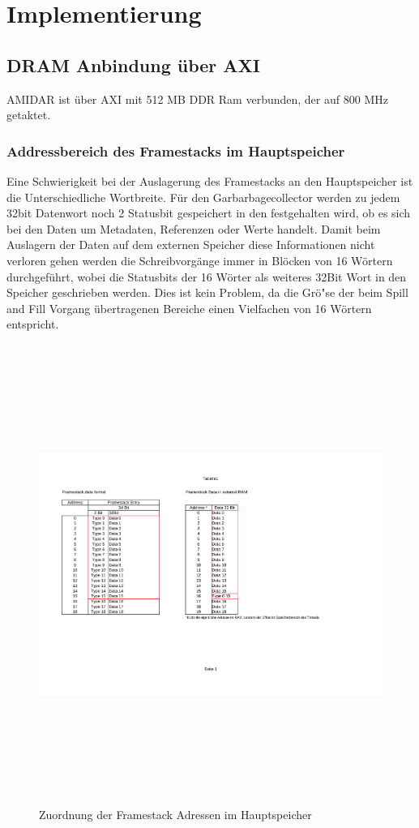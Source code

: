 \chapter{Implementierung}
\label{cha:Implementierung}
\section{DRAM Anbindung \"uber AXI}
AMIDAR ist \"uber AXI mit 512 MB DDR Ram verbunden, der auf 800 MHz getaktet.


\subsection{Addressbereich des Framestacks im Hauptspeicher}
Eine Schwierigkeit bei der Auslagerung des Framestacks an den Hauptspeicher ist die Unterschiedliche Wortbreite. 
F\"ur den Garbarbagecollector werden zu jedem 32bit Datenwort noch 2 Statusbit gespeichert in den festgehalten wird, ob es sich bei den Daten um Metadaten, Referenzen oder Werte handelt. Damit beim Auslagern der Daten auf dem externen Speicher diese Informationen nicht verloren gehen werden die Schreibvorg\"ange immer in Bl\"ocken von 16 W\"ortern durchgef\"uhrt, wobei die Statusbits der 16 W\"orter als weiteres 32Bit Wort in den Speicher geschrieben werden. Dies ist kein Problem, da die Gr\"o"se der beim Spill and Fill Vorgang \"ubertragenen Bereiche einen Vielfachen von 16 W\"ortern entspricht. 

\begin{figure}
	\centering
	\includegraphics[height = 15cm]{PS_RS_graphics/FSBlocksinRam.pdf}
	\caption{Zuordnung der Framestack Adressen im Hauptspeicher}
\end{figure}

